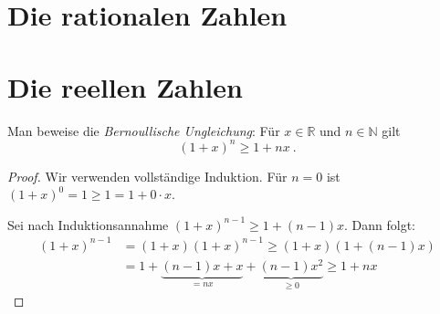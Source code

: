 \section{Die rationalen Zahlen}
\section{Die reellen Zahlen}
\setcounter{aufgabe}{5}
\begin{aufgabe}
	Man beweise die \textit{Bernoullische Ungleichung}: Für $x \in \mathbb R$
	und $n \in \mathbb N$ gilt
	\[
		(1 + x)^n \geq 1 + nx \ .
	\]
\end{aufgabe}
\begin{proof}
	Wir verwenden vollständige Induktion. Für $n = 0$ ist
	$(1 + x)^0 = 1 \geq 1 = 1 + 0 \cdot x$.

	Sei nach Induktionsannahme $(1 + x)^{n-1} \geq 1 + (n-1) x$.
	Dann folgt:
	\begin{align*}
		(1 + x)^{n-1}
			&= (1 + x) (1 + x)^{n-1}
			\geq (1 + x) \left( 1 + (n-1)x \right) \\
			&= 1 + \underbrace{ (n-1) x + x}_{=nx} + \underbrace{ (n-1) x^2}_{ \geq 0}
			\geq 1 + nx
	\end{align*}
\end{proof}

